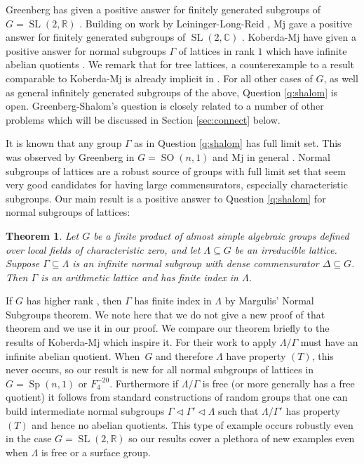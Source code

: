 \documentclass[JEP,XML,SOM,Unicode,published]{cedram}
\newcommand{\bbC}{\ensuremath{\mathbb{C}}}
\newcommand{\bbR}{\ensuremath{\mathbb{R}}}
\DeclareMathOperator{\SL}{SL}
\DeclareMathOperator{\Sp}{Sp}
\DeclareMathOperator{\SO}{SO}
\newtheorem{thm}{Theorem}[section]
\theoremstyle{definition}
\begin{document}
Greenberg has given a positive answer for finitely generated subgroups of $G=\SL(2,\bbR)$ \cite{greenberg-comm}. Building on work by Leininger-Long-Reid \cite{llr-comm}, Mj gave a positive answer for finitely generated subgroups of $\SL(2,\bbC)$ \cite{mj-comm}. Koberda-Mj have given a positive answer for normal subgroups $\Gamma$ of lattices in rank $1$ which have infinite abelian quotients \cite{koberda-mj0,koberda-mj}. We remark that for tree lattices, a counterexample to a result comparable to Koberda-Mj is already implicit in \cite[Prop.\,8.1]{BurgerMozes}. For all other cases of $G$, as well as general infinitely generated subgroups of the above, Question \ref{q:shalom} is open. Greenberg-Shalom's question is closely related to a number of other problems which will be discussed in Section \ref{sec:connect} below.

It is known that any group $\Gamma$ as in Question \ref{q:shalom} has full limit set. This was observed by Greenberg in $G=\SO(n,1)$ and Mj in general \cite{greenberg-comm, mj-comm}. Normal subgroups of lattices are a robust source of groups with full limit set that seem very good candidates for having large commensurators, especially characteristic subgroups. Our main result is a positive answer to Question \ref{q:shalom} for normal subgroups of lattices:

\begin{thm}\label{thm:main}
Let $G$ be a finite product of almost simple algebraic groups defined over local fields of characteristic zero, and let $\Lambda\subseteq G$ be an irreducible lattice. Suppose $\Gamma\subseteq \Lambda$ is an infinite normal subgroup with dense commensurator $\Delta\subseteq G$. Then $\Gamma$ is an arithmetic lattice and has finite index in $\Lambda$.
\end{thm}

If $G$ has higher rank , then $\Gamma$ has finite index in $\Lambda$ by Margulis' Normal Subgroups theorem. We note here that we do not give a new proof of that theorem and we use it in our proof. We compare our theorem briefly to the results of Koberda-Mj which inspire it. For their work to apply $\Lambda/\Gamma$ must have
an infinite abelian quotient. When~$G$ and therefore $\Lambda$ have property $(T)$, this never occurs, so our result is new for all normal subgroups of lattices in $G=\Sp(n,1)$ or $F_4^{-20}$. Furthermore if $\Lambda/\Gamma$ is free (or more generally has a free quotient) it follows from standard constructions of random groups that one can build intermediate normal subgroups $\Gamma \lhd \Gamma' \lhd \Lambda$ such that $\Lambda/\Gamma'$ has property $(T)$ and hence no abelian quotients. This type of example occurs robustly even in the case $G=\SL(2, \mathbb{R})$ so our results cover a plethora of new examples even when $\Lambda$ is free or a surface group.
\end{document}
